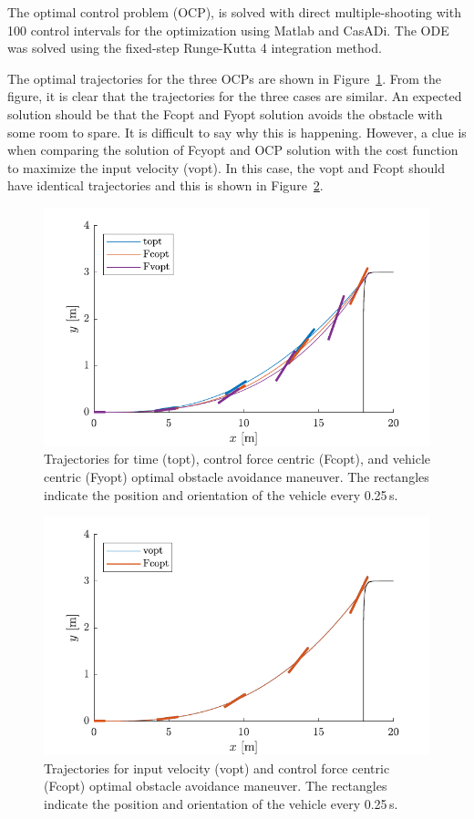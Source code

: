 The optimal control problem (OCP), is solved with direct multiple-shooting with 100 control intervals for the optimization using Matlab and CasADi. The ODE was solved using the fixed-step Runge-Kutta 4 integration method. 

The optimal trajectories for the three OCPs are shown in Figure~\ref{fig:prob6_traj}. From the figure, it is clear that the trajectories for the three cases are similar. An expected solution should be that the Fcopt and Fyopt solution avoids the obstacle with some room to spare. It is difficult to say why this is happening. However, a clue is when comparing the solution of Fcyopt and OCP solution with the cost function to maximize the input velocity (vopt). In this case, the vopt and Fcopt should have identical trajectories and this is shown in Figure~\ref{fig:prob6_v2_traj}. 
\begin{figure}[h!]
    \centering
    \includegraphics{figures/prob6_traj.pdf}
    \caption{Trajectories for time (topt), control force centric (Fcopt), and vehicle centric (Fyopt) optimal obstacle avoidance maneuver. The rectangles indicate the position and orientation of the vehicle every 0.25\,s.}
    \label{fig:prob6_traj}
\end{figure}
\begin{figure}[t!]
    \centering
    \includegraphics{figures/prob6_v2_traj.pdf}
    \caption{Trajectories for input velocity (vopt) and control force centric (Fcopt) optimal obstacle avoidance maneuver. The rectangles indicate the position and orientation of the vehicle every 0.25\,s.}
    \label{fig:prob6_v2_traj}
\end{figure}
